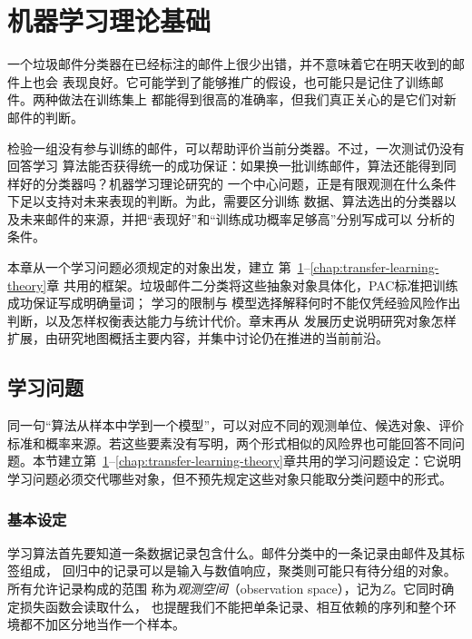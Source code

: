 \chapter{机器学习理论基础}
\label{chap:statistical-learning-framework}

一个垃圾邮件分类器在已经标注的邮件上很少出错，并不意味着它在明天收到的邮件上也会
表现良好。它可能学到了能够推广的假设，也可能只是记住了训练邮件。两种做法在训练集上
都能得到很高的准确率，但我们真正关心的是它们对新邮件的判断。

检验一组没有参与训练的邮件，可以帮助评价当前分类器。不过，一次测试仍没有回答学习
算法能否获得统一的成功保证：如果换一批训练邮件，算法还能得到同样好的分类器吗？机器学习理论研究的
一个中心问题，正是有限观测在什么条件下足以支持对未来表现的判断。为此，需要区分训练
数据、算法选出的分类器以及未来邮件的来源，并把“表现好”和“训练成功概率足够高”分别写成可以
分析的条件。

本章从一个学习问题必须规定的对象出发，建立
第~\ref{chap:statistical-learning-framework}--\ref{chap:transfer-learning-theory}章
共用的框架。垃圾邮件二分类将这些抽象对象具体化，PAC标准把训练成功保证写成明确量词；
学习的限制与
模型选择解释何时不能仅凭经验风险作出判断，以及怎样权衡表达能力与统计代价。章末再从
发展历史说明研究对象怎样扩展，由研究地图概括主要内容，并集中讨论仍在推进的当前前沿。

\section{学习问题}
\label{sec:learning-problem}
\label{sec:statistical-learning-problem}

同一句“算法从样本中学到一个模型”，可以对应不同的观测单位、候选对象、评价标准和概率来源。若这些要素没有写明，两个形式相似的风险界也可能回答不同问题。本节建立第~\ref{chap:statistical-learning-framework}--\ref{chap:transfer-learning-theory}章共用的学习问题设定：它说明学习问题必须交代哪些对象，但不预先规定这些对象只能取分类问题中的形式。

\subsection{基本设定}

学习算法首先要知道一条数据记录包含什么。邮件分类中的一条记录由邮件及其标签组成，
回归中的记录可以是输入与数值响应，聚类则可能只有待分组的对象。所有允许记录构成的范围
称为\emph{观测空间}（observation space），记为$Z$。它同时确定损失函数会读取什么，
也提醒我们不能把单条记录、相互依赖的序列和整个环境都不加区分地当作一个样本。

